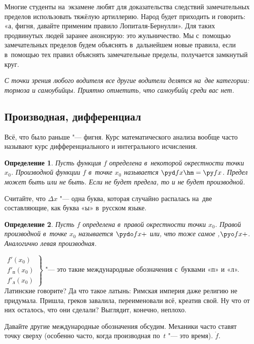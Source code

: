 \documentclass[a4paper,10pt,twoside]{article}
\newtheorem{Def}{Определение}[section]
\begin{document}
Многие студенты на~экзамене любят для доказательства следствий замечательных пределов использовать тяжёлую артиллерию. Народ
будет приходить и говорить: «а, фигня, давайте применим правило Лопиталя-Бернулли». Для таких продвинутых людей заранее анонсирую: это жульничество. Мы с~помощью замечательных пределов будем объяснять в~дальнейшем новые правила, если в~помощью тех правил объяснять замечательные пределы, получается замкнутый круг.

\textit{С точки зрения любого водителя все другие водители делятся на~две категории: тормоза и самоубийцы. Приятно отметить, что самоубийц среди вас нет.}

\subsection{Производная, дифференциал}

Всё, что было раньше "--- фигня. Курс математического анализа вообще часто называют курс дифференциального и интегрального исчисления.

\begin{Def}
    Пусть функция $f$ определена в~некоторой окрестности точки $x_0$. Производной функции $f$ в~точке $x_0$ называется
    $\pyd fx\hm=\py fx$. Предел может быть или не быть. Если не будет предела, то и не будет производной.
\end{Def}

Считайте, что $\Delta x$ "--- одна буква, которая случайно распалась на~две составляющие, как буква «ы» в~русском языке.

\begin{Def}
Пусть $f$ определена в~правой окрестности точки $x_0$.
Правой производной в~точке $x_0$ называется $\pydo fx+$ или, что тоже самое ,$\pyo fx+$. Аналогично левая производная.
\end{Def}

$\left.\begin{matrix}
f'(x_0)\\ f'_\text{п}(x_0)\\ f'_\text{л}(x_0)
\end{matrix}\right\}$ "--- это такие международные обозначения с~буквами «п» и «л». Латинские говорите? Да что такое латынь: Римская империя даже религию не придумала. Пришла, греков завалила, переименовали всё, креатив свой. Ну что от них осталось, что они сделали? Выглядит, конечно, неплохо.

Давайте другие международные обозначения обсудим. Механики часто ставят точку сверху (особенно часто, когда производная по~$t$ "--- это время). $\boxed {\dot f}$.
\end{document}
